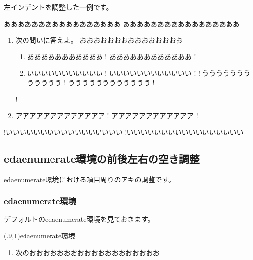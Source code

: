 \documentclass[fleqn,a4j]{jarticle}
\begin{document}
左インデントを調整した一例です。

\begin{showpEx}{}
あああああああああああああああああ
あああああああああああああああああ
\apnlist{\itemindent=1\zw
  \leftmargin=1\zw
  \listparindent=1\zw}
\begin{enumerate}[1.~]
  \item 次の問いに答えよ。
    おおおおおおおおおおおおおおお
\apnlist{\narrowsep
  \itemindent=1\zw
  \topsep=0\zw
  \leftmargin=1\zw
  \listparindent=1\zw}
    \begin{enumerate}[(1)]
!      \item あああああああああああ
!       ああああああああああああ
!      \item いいいいいいいいいいい
!       いいいいいいいいいいいい
!
!       うううううううううううう
!       うううううううううううう
!    \end{enumerate}
!  \item アアアアアアアアアアアアア
!   アアアアアアアアアアアア
!\end{enumerate}
!いいいいいいいいいいいいいいいいい
!いいいいいいいいいいいいいいいいい
\end{showpEx}

\subsection{\textsf{edaenumerate}環境の前後左右の空き調整}
\textsf{edaenumerate}環境における項目周りのアキの調整です。

\subsubsection{\textsf{edaenumerate}環境}
デフォルトの\textsf{edaenumerate}環境を見ておきます。
\begin{showEx}(.9,1){\textsf{edaenumerate}環境}
\begin{enumerate}[1.~]
  \item 次のおおおおおおおおおおおおおおおおおおお
\end{enumerate}
\end{showEx}
\end{document}
